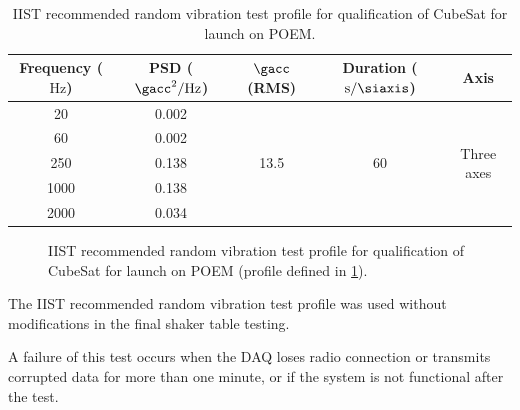 \documentclass{report}
\begin{document}
\begin{table}[t]
  \centering
  \begin{tabular}{|c | c | c | c | c|}
    \hline
    \textbf{Frequency ($\si{\hertz}$)} & \textbf{PSD ($\si{\square\gacc\per\hertz}$)} & \textbf{$\si{\gacc}$ (RMS)} & \textbf{Duration ($\si{\second\per\siaxis}$)} & \textbf{Axis}               \\ \hline
    20                                 & 0.002                                        & \multirow{5}{*}{13.5}       & \multirow{5}{*}{60}                           & \multirow{5}{*}{Three axes} \\ \cline{1-2}
    60                                 & 0.002                                        &                             &                                               &                             \\ \cline{1-2}
    250                                & 0.138                                        &                             &                                               &                             \\ \cline{1-2}
    1000                               & 0.138                                        &                             &                                               &                             \\ \cline{1-2}
    2000                               & 0.034                                        &                             &                                               &                             \\ \hline
  \end{tabular}
  \caption{IIST recommended random vibration test profile for qualification of CubeSat for launch on POEM.}
  \label{tabl:random-vibration-profile-iist}
\end{table}


\begin{figure}[H]
  \centering
  
  \caption{IIST recommended random vibration test profile for qualification of CubeSat for launch on POEM (profile defined in \ref{tabl:random-vibration-profile-iist}).}
  \label{fig:random-vibration-qualification-level}
\end{figure}

The IIST recommended random vibration test profile was used without modifications in the final shaker table testing.

A failure of this test occurs when the DAQ loses radio connection or transmits corrupted data for more than one minute, or if the system is not functional after the test.
\end{document}

